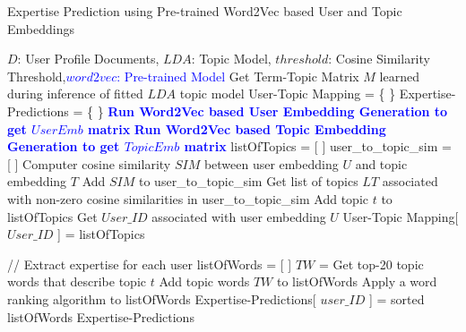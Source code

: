             \begin{algorithm}
            \caption{Expertise Prediction using Pre-trained Word2Vec based User and Topic Embeddings}
            \label{alg:word2vec_emb}
            \begin{algorithmic}[1]
               \REQUIRE $D$: User Profile Documents, $LDA$: Topic Model, $threshold$: Cosine Similarity Threshold,\textcolor{blue}{$word2vec$: Pre-trained Model}
                \STATE Get Term-Topic Matrix $M$ learned during inference of fitted $LDA$ topic model
                \STATE User-Topic Mapping = \{ \}
                \STATE Expertise-Predictions = \{ \}
                \STATE \textbf{\textcolor{blue}{Run Word2Vec based User Embedding Generation to get $UserEmb$ matrix}}
                \STATE \textbf{\textcolor{blue}{Run Word2Vec based Topic Embedding Generation to get $TopicEmb$ matrix}}
                \STATE
                    \STATE listOfTopics = [ ]
                    \STATE user\_to\_topic\_sim = [ ]
                        \STATE Computer cosine similarity $SIM$ between user embedding $U$ and topic embedding $T$
                        \STATE Add $SIM$ to user\_to\_topic\_sim
                    \ENDFOR
                    \STATE
                    \STATE Get list of topics $LT$ associated with non-zero cosine similarities in user\_to\_topic\_sim
                            \STATE Add topic $t$ to listOfTopics
                        \ENDIF
                    \ENDFOR
                    \STATE Get $User\_ID$ associated with user embedding $U$
                    \STATE User-Topic Mapping[ $User\_ID$ ] = listOfTopics
                    
                    \STATE
                    \STATE // Extract expertise for each user
                    \STATE listOfWords = [ ]
                        \STATE $TW$ = Get top-20 topic words that describe topic $t$
                        \STATE Add topic words $TW$ to listOfWords
                    \ENDFOR
                    \STATE Apply a word ranking algorithm to listOfWords
                    \STATE Expertise-Predictions[ $user\_ID$ ] = sorted listOfWords
                \ENDFOR
                \RETURN Expertise-Predictions
            \end{algorithmic}
            \end{algorithm}
            

